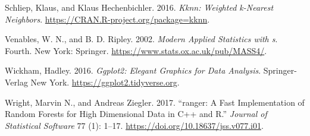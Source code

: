 \begin{CSLReferences}{1}{0}
\leavevmode{}%
Schliep, Klaus, and Klaus Hechenbichler. 2016. \emph{Kknn: Weighted k-Nearest Neighbors}. \url{https://CRAN.R-project.org/package=kknn}.

\leavevmode{}%
Venables, W. N., and B. D. Ripley. 2002. \emph{Modern Applied Statistics with s}. Fourth. New York: Springer. \url{https://www.stats.ox.ac.uk/pub/MASS4/}.

\leavevmode{}%
Wickham, Hadley. 2016. \emph{Ggplot2: Elegant Graphics for Data Analysis}. Springer-Verlag New York. \url{https://ggplot2.tidyverse.org}.

\leavevmode{}%
Wright, Marvin N., and Andreas Ziegler. 2017. {``{ranger}: A Fast Implementation of Random Forests for High Dimensional Data in {C++} and {R}.''} \emph{Journal of Statistical Software} 77 (1): 1--17. \url{https://doi.org/10.18637/jss.v077.i01}.

\end{CSLReferences}



\address{%
Alan Inglis\\
Maynooth University\\%
Department of Mathematics and Statistics\\ Maynooth, Ireland\\
%
%
\textit{ORCiD: \href{https://orcid.org/0000-0002-1151-6657}{0000-0002-1151-6657}}\\%
\href{mailto:alan.inglis@mu.ie}{\nolinkurl{alan.inglis@mu.ie}}%
}

\address{%
Andrew Parnell\\
Maynooth University\\%
Hamilton Institute\\ Maynooth, Ireland\\
%
%
\textit{ORCiD: \href{https://orcid.org/0000-0001-7956-7939}{0000-0001-7956-7939}}\\%
\href{mailto:andrew.parnell@mu.ie}{\nolinkurl{andrew.parnell@mu.ie}}%
}

\address{%
Catherine Hurley\\
Maynooth University\\%
Department of Mathematics and Statistics\\ Maynooth, Ireland\\
%
%
\textit{ORCiD: \href{https://orcid.org/0000-0003-2758-5531}{0000-0003-2758-5531}}\\%
\href{mailto:catherine.hurley@mu.ie}{\nolinkurl{catherine.hurley@mu.ie}}%
}
